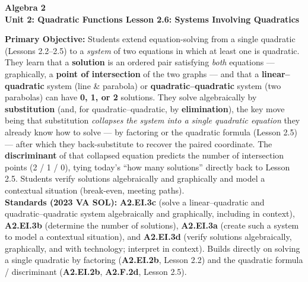 \documentclass[10pt]{article}
\newcommand{\CourseName}{Algebra 2}
\newcommand{\UnitNumberName}{Unit 2: Quadratic Functions \quad}
\newcommand{\LessonNumberName}{Lesson 2.6: Systems Involving Quadratics}
\begin{document}
\begin{center}
    {\Large\bfseries \CourseName \\
    {\small\bfseries \UnitNumberName \LessonNumberName}}
\end{center}

\begin{tcolorbox}[colback=forestbg, colframe=forest, boxrule=0.9pt, arc=2mm,
    left=2mm, right=2mm, top=1.5mm, bottom=1.5mm]
    \textbf{Primary Objective:} Students extend equation-solving from a single quadratic (Lessons 2.2--2.5) to
    a \emph{system} of two equations in which at least one is quadratic. They learn that a \textbf{solution} is
    an ordered pair satisfying \emph{both} equations --- graphically, a \textbf{point of intersection} of the
    two graphs --- and that a \textbf{linear--quadratic} system (line \& parabola) or
    \textbf{quadratic--quadratic} system (two parabolas) can have \textbf{0, 1, or 2} solutions. They solve
    algebraically by \textbf{substitution} (and, for quadratic--quadratic, by \textbf{elimination}), the key
    move being that substitution \emph{collapses the system into a single quadratic equation} they already know
    how to solve --- by factoring or the quadratic formula (Lesson 2.5) --- after which they back-substitute to
    recover the paired coordinate. The \textbf{discriminant} of that collapsed equation predicts the number of
    intersection points (2 / 1 / 0), tying today's ``how many solutions'' directly back to Lesson 2.5. Students
    verify solutions algebraically and graphically and model a contextual situation (break-even, meeting paths).
    \\[2pt]
    \textbf{Standards (2023 VA SOL):} \textbf{A2.EI.3c} (solve a linear--quadratic and quadratic--quadratic
    system algebraically and graphically, including in context), \textbf{A2.EI.3b} (determine the number of
    solutions), \textbf{A2.EI.3a} (create such a system to model a contextual situation), and \textbf{A2.EI.3d}
    (verify solutions algebraically, graphically, and with technology; interpret in context). Builds directly on
    solving a single quadratic by factoring (\textbf{A2.EI.2b}, Lesson 2.2) and the quadratic formula /
    discriminant (\textbf{A2.EI.2b}, \textbf{A2.F.2d}, Lesson 2.5).
\end{tcolorbox}
\end{document}

